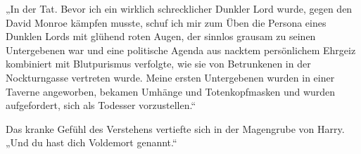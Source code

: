 „In der Tat. Bevor ich ein wirklich schrecklicher Dunkler Lord wurde, gegen den David Monroe kämpfen musste, schuf ich mir zum Üben die Persona eines Dunklen Lords mit glühend roten Augen, der sinnlos grausam zu seinen Untergebenen war und eine politische Agenda aus nacktem persönlichem Ehrgeiz kombiniert mit Blutpurismus verfolgte, wie sie von Betrunkenen in der Nockturngasse vertreten wurde. Meine ersten Untergebenen wurden in einer Taverne angeworben, bekamen Umhänge und Totenkopfmasken und wurden aufgefordert, sich als Todesser vorzustellen.“

Das kranke Gefühl des Verstehens vertiefte sich in der Magengrube von Harry.
„Und du hast dich Voldemort genannt.“

